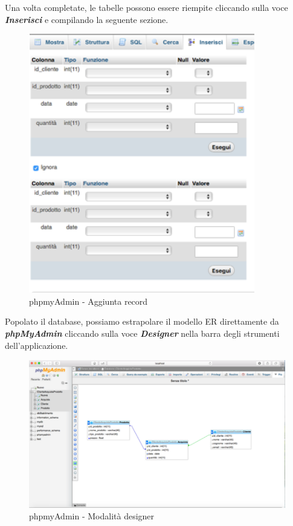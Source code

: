 Una volta completate, le tabelle possono essere riempite cliccando sulla voce \textit{\textbf{Inserisci}} e compilando la seguente sezione.

\begin{center}
\begin{figure}[H]
\centering
\includegraphics[scale=1]{figures/phpmyAdmin_addrecord.png}
\caption{phpmyAdmin - Aggiunta record} 
\end{figure}
\end{center}

Popolato il database, possiamo estrapolare il modello ER direttamente da \textit{\textbf{phpMyAdmin}} cliccando sulla voce \textit{\textbf{Designer}} nella barra degli strumenti dell'applicazione.

\begin{center}
\begin{figure}[H]
\centering
\includegraphics[scale=0.8]{figures/phpmyAdmin_designer.png}
\caption{phpmyAdmin - Modalità designer} 
\end{figure}
\end{center}

